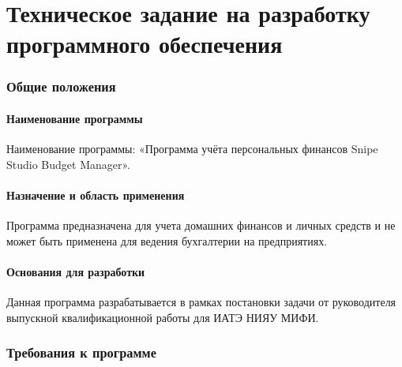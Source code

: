 \part{Техническое задание на разработку программного обеспечения }

\section{Общие положения}
\subsection{Наименование программы}
Наименование программы: «Программа учёта персональных финансов Snipe Studio Budget Manager».
\subsection{Назначение и область применения}
Программа предназначена для учета домашних финансов и личных средств и не может быть применена для ведения бухгалтерии на предприятиях.
\subsection{Основания для разработки}
Данная программа разрабатывается в рамках постановки задачи от руководителя выпускной квалификационной работы для ИАТЭ НИЯУ МИФИ. 
\section{Требования к программе}
